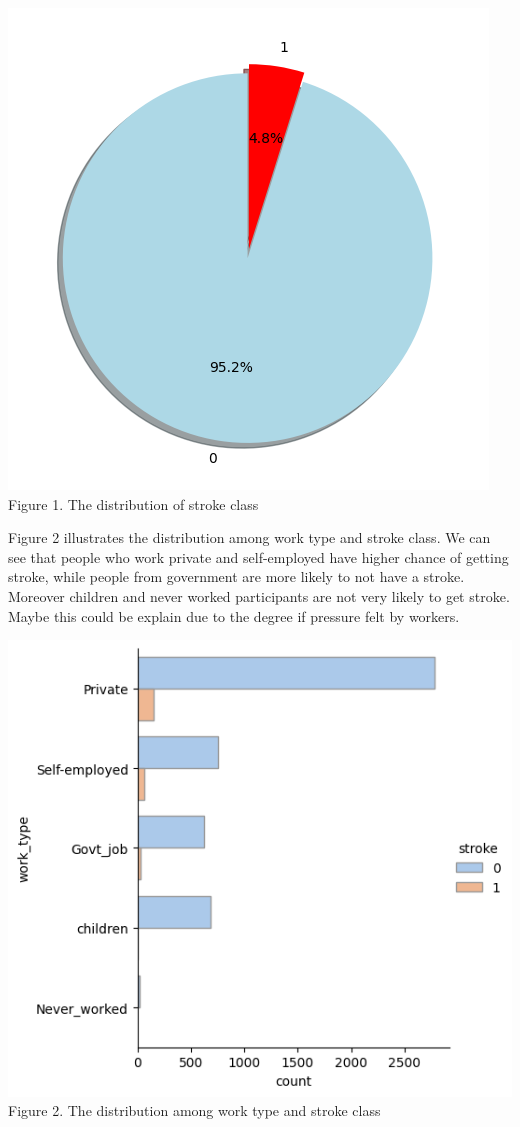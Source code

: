 \documentclass[a4paper]{report}
\begin{document}
	\begin{center}
		\includegraphics[scale=0.5]{imbalance.png} \\
		\small Figure 1. The distribution of stroke class
	\end{center}
	
	Figure 2 illustrates the distribution among work type and stroke class. We can see that people who work private and self-employed have higher chance of getting stroke, while people from government are more likely to not have a stroke. Moreover children and never worked participants are not very likely to get stroke. Maybe this could be explain due to the degree if pressure felt by workers.
	\begin{center}
		\includegraphics[scale=0.75]{work_type.png} \\
		\small Figure 2. The distribution among work type and stroke class
	\end{center}
	
\end{document}
